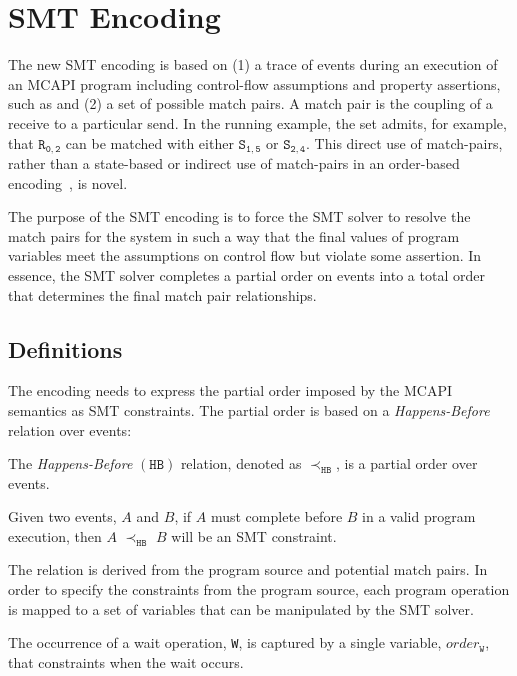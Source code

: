 \section{SMT Encoding}\label{sec:smt}

The new SMT encoding is based on (1) a trace of events during an
execution of an MCAPI program including control-flow assumptions and
property assertions, such as  and (2) a set of
possible match pairs. A match pair is the coupling of a receive to a
particular send.  In the running example, the set admits, for example,
that $\mathtt{R_{0,2}}$ can be matched with either $\mathtt{S_{1,5}}$
or $\mathtt{S_{2,4}}$. This direct use of match-pairs, rather than a
state-based or indirect use of match-pairs in an order-based
encoding~\cite{elwakil:padtad10,elwakil:atva10}, is novel.

The purpose of the SMT encoding is to force the SMT solver to resolve
the match pairs for the system in such a way that the final values of
program variables meet the assumptions on control flow but violate
some assertion. In essence, the SMT solver completes a partial order
on events into a total order that determines the final match pair
relationships.

\subsection{Definitions} \label{sec:smt-defns}

The encoding needs to express the partial order imposed by the MCAPI
semantics as SMT constraints. The partial order is based on a
\emph{Happens-Before} relation over events:

\begin{definition}
The \emph{Happens-Before} $(\mathtt{HB})$ relation, denoted as
$\mathrm{\prec_\mathtt{HB}}$, is a partial order over events.
\label{def:hb}
\end{definition}

Given two events, $A$ and $B$, if $A$ must complete before $B$ in a
valid program execution, then $A$ $\mathrm{\prec_{\mathtt{HB}}}$ $B$
will be an SMT constraint.

The relation is derived from the program source and potential match pairs. In
order to specify the constraints from the program source, each program operation is mapped to a set of variables that can be manipulated by the SMT solver.

\begin{definition}[Wait] \label{def:event}
The occurrence of a wait operation, \texttt{W}, is captured by a
single variable, $\mathit{order}_\mathtt{W}$, that constraints when
the wait occurs.
\end{definition}

